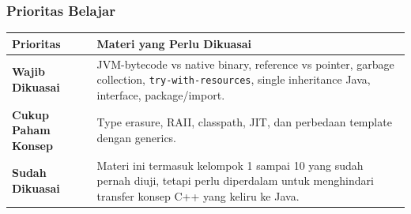\subsubsection{Prioritas Belajar}

\begin{tabularx}{\textwidth}{|L{0.22\textwidth}|X|}
\hline
\textbf{Prioritas} & \textbf{Materi yang Perlu Dikuasai} \\
\hline
\textbf{Wajib Dikuasai} & JVM-bytecode vs native binary, reference vs pointer, garbage collection, \texttt{try-with-resources}, single inheritance Java, interface, package/import. \\
\hline
\textbf{Cukup Paham Konsep} & Type erasure, RAII, classpath, JIT, dan perbedaan template dengan generics. \\
\hline
\textbf{Sudah Dikuasai} & Materi ini termasuk kelompok 1 sampai 10 yang sudah pernah diuji, tetapi perlu diperdalam untuk menghindari transfer konsep C++ yang keliru ke Java. \\
\hline
\end{tabularx}
